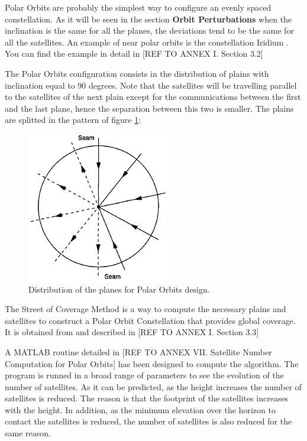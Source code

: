 Polar Orbits are probably the simplest way to configure an evenly spaced constellation. As it will be seen in the section \textbf{Orbit Perturbations} when the inclination is the same for all the planes, the deviations tend to be the same for all the satellites. An example of near polar orbits is the constellation Iridium \cite{Iridium}. You can find the example in detail in [{REF TO ANNEX I. Section 3.2}]

\begin{minipage}{0.45\textwidth}
The Polar Orbits configuration consists in the distribution of plains with inclination equal to 90 degrees. Note that the satellites will be travelling parallel to the satellites of the next plain except for the communications between the first and the last plane, hence the separation between this two is smaller. The plains are splitted in the pattern of figure \ref{fig:polardist}:
\end{minipage}
\vline
\begin{minipage}{0.45\textwidth}
\begin{figure}[H]
\begin{center}
\includegraphics[scale=0.40]{PolarOrbits/planeconfig.png}
\caption{Distribution of the planes for Polar Orbits design.}
\label{fig:polardist}
\end{center}
\end{figure}

\end{minipage}

The Street of Coverage Method is a way to compute the necessary plains and satellites to construct a Polar Orbit Constellation that provides global coverage. It is obtained from 
\cite{Chobotov2002} and described in 
[{REF TO ANNEX I. Section 3.3}]

A MATLAB routine detailed in [{REF TO ANNEX VII. Satellite Number Computation for Polar Orbits}] has been designed to compute the  algorithm. The program is runned in a broad range of parameters to see the evolution of the number of satellites. As it can be predicted, as the height increases the number of satellites is reduced. The reason is that the footprint of the satellites increases with the height. In addition, as the minimum elevation over the horizon to contact the satellites is reduced, the number of satellites is also reduced for the same reason. 

